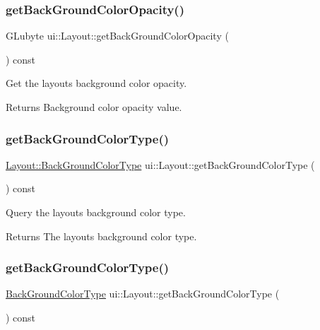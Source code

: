 \subsubsection{\texorpdfstring{get\+Back\+Ground\+Color\+Opacity()}{getBackGroundColorOpacity()}\hspace{0.1cm}{\footnotesize\ttfamily [2/2]}}
{\footnotesize\ttfamily G\+Lubyte ui\+::\+Layout\+::get\+Back\+Ground\+Color\+Opacity (\begin{DoxyParamCaption}{ }\end{DoxyParamCaption}) const}

Get the layout\textquotesingle{}s background color opacity. \begin{DoxyReturn}{Returns}
Background color opacity value. 
\end{DoxyReturn}
\mbox{\label{classui_1_1Layout_afdc0ade57a1e38754ad650026420c1e3}} 
\subsubsection{\texorpdfstring{get\+Back\+Ground\+Color\+Type()}{getBackGroundColorType()}\hspace{0.1cm}{\footnotesize\ttfamily [1/2]}}
{\footnotesize\ttfamily \hyperlink{classui_1_1Layout_a2aad69f15823c5f22d8ed72bf2ac7472}{Layout\+::\+Back\+Ground\+Color\+Type} ui\+::\+Layout\+::get\+Back\+Ground\+Color\+Type (\begin{DoxyParamCaption}{ }\end{DoxyParamCaption}) const}

Query the layout\textquotesingle{}s background color type. \begin{DoxyReturn}{Returns}
The layout\textquotesingle{}s background color type. 
\end{DoxyReturn}
\mbox{\label{classui_1_1Layout_abc5d86e632f8c9ac82118ed6a1e592ef}} 
\subsubsection{\texorpdfstring{get\+Back\+Ground\+Color\+Type()}{getBackGroundColorType()}\hspace{0.1cm}{\footnotesize\ttfamily [2/2]}}
{\footnotesize\ttfamily \hyperlink{classui_1_1Layout_a2aad69f15823c5f22d8ed72bf2ac7472}{Back\+Ground\+Color\+Type} ui\+::\+Layout\+::get\+Back\+Ground\+Color\+Type (\begin{DoxyParamCaption}{ }\end{DoxyParamCaption}) const}

